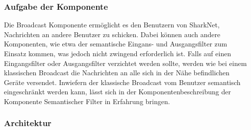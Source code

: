 \subsubsection{Aufgabe der Komponente}
Die Broadcast Komponente ermöglicht es den Benutzern von SharkNet, Nachrichten an andere Benutzer zu schicken. Dabei können auch andere Komponenten, wie etwa der semantische Eingans- und Ausgangsfilter zum Einsatz kommen, was jedoch nicht zwingend erforderlich ist. Falls auf einen Eingangsfilter oder Ausgangsfilter verzichtet werden sollte, werden wie bei einem klassischen Broadcast die Nachrichten an alle sich in der Nähe befindlichen Geräte versendet. Inwiefern der klassische Broadcast vom Benutzer semantisch eingeschränkt werden kann, lässt sich in der Komponentenbeschreibung der Komponente Semantischer Filter in Erfahrung bringen.

\subsubsection{Architektur}

